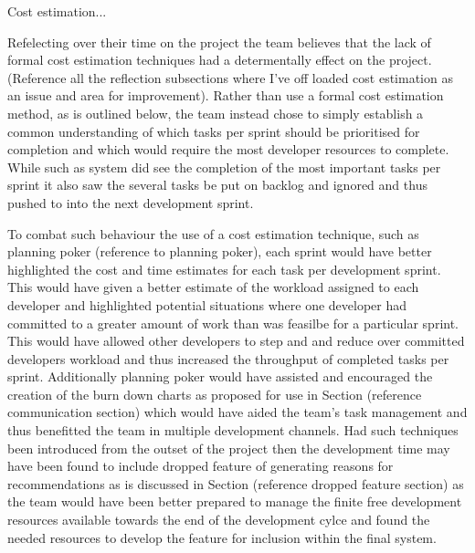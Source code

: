 \documentclass{l3proj}
\begin{document}
%

Cost estimation...

Refelecting over their time on the project the team believes that the lack of formal cost estimation techniques had a determentally effect on the project. (Reference all the reflection subsections where I've off loaded cost estimation as an issue and area for improvement). Rather than use a formal cost estimation method, as is outlined below, the team instead chose to simply establish a common understanding of which tasks per sprint should be prioritised for completion and which would require the most developer resources to complete. While such as system did see the completion of the most important tasks per sprint it also saw the several tasks be put on backlog and ignored and thus pushed to into the next development sprint. 

To combat such behaviour the use of a cost estimation technique, such as planning poker (reference to planning poker), each sprint would have better highlighted the cost and time estimates for each task per development sprint. This would have given a better estimate of the workload assigned to each developer and highlighted potential situations where one developer had committed to a greater amount of work than was feasilbe for a particular sprint. This would have allowed other developers to step and and reduce over committed developers workload and thus increased the throughput of completed tasks per sprint. Additionally planning poker would have assisted and encouraged the creation of the burn down charts as proposed for use in Section (reference communication section) which would have aided the team's task management and thus benefitted the team in multiple development channels. Had such techniques been introduced from the outset of the project then the development time may have been found to include dropped feature of generating reasons for recommendations as is discussed in Section (reference dropped feature section) as the team would have been better prepared to manage the finite free development resources available towards the end of the development cylce and found the needed resources to develop the feature for inclusion within the final system. 
\end{document}
